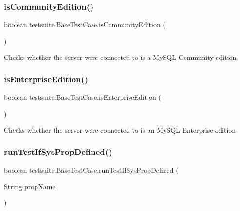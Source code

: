 \subsubsection{\texorpdfstring{is\+Community\+Edition()}{isCommunityEdition()}}
{\footnotesize\ttfamily boolean testsuite.\+Base\+Test\+Case.\+is\+Community\+Edition (\begin{DoxyParamCaption}{ }\end{DoxyParamCaption})\hspace{0.3cm}{\ttfamily [protected]}}

Checks whether the server we\textquotesingle{}re connected to is a My\+S\+QL Community edition \mbox{\label{classtestsuite_1_1_base_test_case_ae29a3a848b87638921a7078f572b3f83}} 
\subsubsection{\texorpdfstring{is\+Enterprise\+Edition()}{isEnterpriseEdition()}}
{\footnotesize\ttfamily boolean testsuite.\+Base\+Test\+Case.\+is\+Enterprise\+Edition (\begin{DoxyParamCaption}{ }\end{DoxyParamCaption})\hspace{0.3cm}{\ttfamily [protected]}}

Checks whether the server we\textquotesingle{}re connected to is an My\+S\+QL Enterprise edition \mbox{\label{classtestsuite_1_1_base_test_case_a3578b222700fc502212ce9834194ebaa}} 
\subsubsection{\texorpdfstring{run\+Test\+If\+Sys\+Prop\+Defined()}{runTestIfSysPropDefined()}}
{\footnotesize\ttfamily boolean testsuite.\+Base\+Test\+Case.\+run\+Test\+If\+Sys\+Prop\+Defined (\begin{DoxyParamCaption}\item[{String}]{prop\+Name }\end{DoxyParamCaption})\hspace{0.3cm}{\ttfamily [protected]}}

